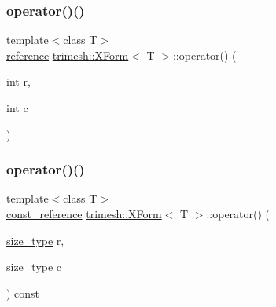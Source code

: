\subsubsection{\texorpdfstring{operator()()}{operator()()}\hspace{0.1cm}{\footnotesize\ttfamily [2/4]}}
{\footnotesize\ttfamily template$<$class T$>$ \\
\hyperlink{classtrimesh_1_1XForm_afef5285ff7d9ea2e25a4bb4d966bd674}{reference} \hyperlink{classtrimesh_1_1XForm}{trimesh\+::\+X\+Form}$<$ T $>$\+::operator() (\begin{DoxyParamCaption}\item[{int}]{r,  }\item[{int}]{c }\end{DoxyParamCaption})\hspace{0.3cm}{\ttfamily [inline]}}

\mbox{\label{classtrimesh_1_1XForm_afe061d1d4d3d2c399ffb0648bc16f059}} 
\subsubsection{\texorpdfstring{operator()()}{operator()()}\hspace{0.1cm}{\footnotesize\ttfamily [3/4]}}
{\footnotesize\ttfamily template$<$class T$>$ \\
\hyperlink{classtrimesh_1_1XForm_a33bd450d8902f70aaf7d4bf9fec01502}{const\+\_\+reference} \hyperlink{classtrimesh_1_1XForm}{trimesh\+::\+X\+Form}$<$ T $>$\+::operator() (\begin{DoxyParamCaption}\item[{\hyperlink{classtrimesh_1_1XForm_aa219f141417c9026a74dec8b6279d4bf}{size\+\_\+type}}]{r,  }\item[{\hyperlink{classtrimesh_1_1XForm_aa219f141417c9026a74dec8b6279d4bf}{size\+\_\+type}}]{c }\end{DoxyParamCaption}) const\hspace{0.3cm}{\ttfamily [inline]}}

\mbox{\label{classtrimesh_1_1XForm_a7f3b2e8fecc39c0d28b965802892d4bd}} 
